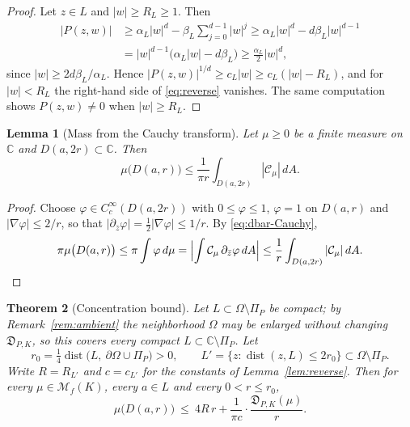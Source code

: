 \documentclass[10pt,a4paper]{amsart}
\newtheorem{theorem}{Theorem}[section]
\newtheorem{lemma}[theorem]{Lemma}
\newcommand{\bC}{\mathbb C}
\newcommand{\M}{\mathcal M}
\newcommand{\Cauchy}{\mathcal C}
\newcommand{\dist}{\operatorname{dist}}
\begin{document}
\begin{proof}
Let $z\in L$ and $|w|\geq R_L\geq1$.  Then
\begin{align*}
 |P(z,w)|
 &\geq\alpha_L|w|^d-\beta_L\sum_{j=0}^{d-1}|w|^{j}
 \geq\alpha_L|w|^d-d\beta_L|w|^{d-1}\\
 &=|w|^{d-1}\bigl(\alpha_L|w|-d\beta_L\bigr)
 \geq\frac{\alpha_L}{2}|w|^{d},
\end{align*}
since $|w|\geq 2d\beta_L/\alpha_L$.  Hence $|P(z,w)|^{1/d}\geq c_L|w|\geq
c_L(|w|-R_L)$, and for $|w|<R_L$ the right-hand side of \eqref{eq:reverse}
vanishes.  The same computation shows $P(z,w)\neq0$ when $|w|\geq R_L$.
\end{proof}

\begin{lemma}[Mass from the Cauchy transform]\label{lem:mass}
Let $\mu\geq0$ be a finite measure on $\bC$ and $D(a,2r)\subset\bC$.  Then
\begin{equation}\label{eq:mass-from-C}
 \mu\bigl(D(a,r)\bigr)
 \leq\frac{1}{\pi r}\int_{D(a,2r)}|\Cauchy_\mu|\,dA .
\end{equation}
\end{lemma}

\begin{proof}
Choose $\varphi\in C_c^\infty(D(a,2r))$ with $0\leq\varphi\leq1$, $\varphi=1$ on
$D(a,r)$ and $|\nabla\varphi|\leq2/r$, so that
$|\partial_{\bar z}\varphi|=\frac12|\nabla\varphi|\leq1/r$.  By
\eqref{eq:dbar-Cauchy},
\[
 \pi\mu\bigl(D(a,r)\bigr)\leq\pi\int\varphi\,d\mu
 =\Bigl|\int\Cauchy_\mu\,\partial_{\bar z}\varphi\,dA\Bigr|
 \leq\frac1r\int_{D(a,2r)}|\Cauchy_\mu|\,dA . \qedhere
\]
\end{proof}

\begin{theorem}[Concentration bound]\label{thm:concentration}
Let $L\subset\Omega\setminus\Pi_P$ be compact; by Remark~\ref{rem:ambient} the
neighborhood $\Omega$ may be enlarged without changing $\mathfrak D_{P,K}$, so
this covers every compact $L\subset\bC\setminus\Pi_P$.  Let
\[
 r_0=\tfrac14\dist\bigl(L,\ \partial\Omega\cup\Pi_P\bigr)>0,
 \qquad
 L'=\{z:\dist(z,L)\leq2r_0\}\subset\Omega\setminus\Pi_P .
\]
Write $R=R_{L'}$ and $c=c_{L'}$ for the constants of Lemma~\ref{lem:reverse}.
Then for every $\mu\in\M_f(K)$, every $a\in L$ and every $0<r\leq r_0$,
\begin{equation}\label{eq:concentration}
 \mu\bigl(D(a,r)\bigr)
 \ \leq\ 4R\,r+\frac{1}{\pi c}\cdot\frac{\mathfrak D_{P,K}(\mu)}{r}.
\end{equation}
\end{theorem}
\end{document}
